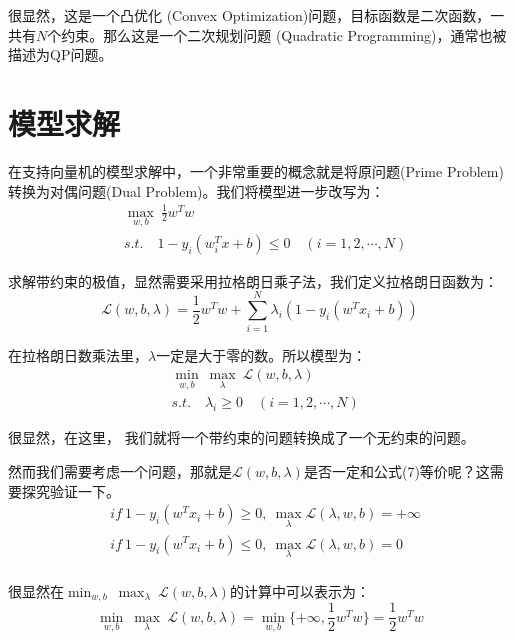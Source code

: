 \documentclass[a4paper]{article}
\begin{document}
很显然，这是一个凸优化 (Convex Optimization)问题，目标函数是二次函数，一共有$N$个约束。那么这是一个二次规划问题 (Quadratic Programming)，通常也被描述为QP问题。

\section{模型求解}
在支持向量机的模型求解中，一个非常重要的概念就是将原问题(Prime Problem)转换为对偶问题(Dual Problem)。我们将模型进一步改写为：
\begin{equation}
    \begin{split}
        & \max_{w,b} \ \frac{1}{2} w^Tw \\
        & s.t. \quad 1-y_i(w^T_ix+b)\leq 0 \quad (i = 1,2,\cdots,N)
    \end{split}
\end{equation}

求解带约束的极值，显然需要采用拉格朗日乘子法，我们定义拉格朗日函数为：
\begin{equation}
    \mathcal{L}(w,b,\lambda) = \frac{1}{2}w^Tw + \sum_{i=1}^N\lambda_i(1-y_i(w^Tx_i+b))
\end{equation}

在拉格朗日数乘法里，$\lambda$一定是大于零的数。所以模型为：
\begin{equation}
    \begin{split}
        & \min_{w,b} \ \max_\lambda \ \mathcal{L}(w,b,\lambda) \\
        & s.t. \quad \lambda_i \geq 0 \quad (i = 1,2,\cdots,N)
    \end{split}
\end{equation}

很显然，在这里，{\color{red} 我们就将一个带约束的问题转换成了一个无约束的问题。}

然而我们需要考虑一个问题，那就是$\mathcal{L}(w,b,\lambda)$是否一定和公式(7)等价呢？这需要探究验证一下。
\begin{equation}
    \begin{split}
        & if \ 1-y_i(w^Tx_i+b)\geq 0,\ \max_\lambda\mathcal{L}(\lambda,w,b)=+\infty \\
        & if \ 1-y_i(w^Tx_i+b)\leq 0,\ \max_\lambda\mathcal{L}(\lambda,w,b)=0 \\
    \end{split}
\end{equation}

很显然在$\min_{w,b} \ \max_\lambda \ \mathcal{L}(w,b,\lambda)$的计算中可以表示为：
\begin{equation}
    \min_{w,b} \ \max_\lambda \ \mathcal{L}(w,b,\lambda) = \min_{w,b}\{ +\infty,\frac{1}{2}w^Tw \} = \frac{1}{2}w^Tw
\end{equation}
\end{document}

